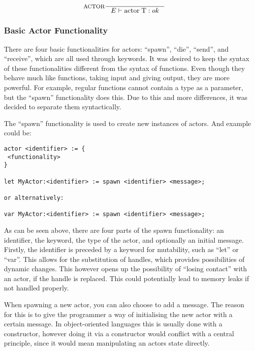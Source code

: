 \begin{align*}
&\inference[ACTOR]{}
                 {\Tenv \mathbin{\text{actor}} \; \Tt: ok}
\end{align*}

\subsubsection{Basic Actor Functionality}
\label{subsubsec:BasicActorFunctionality}
There are four basic functionalities for actors: \enquote{spawn}, \enquote{die}, \enquote{send}, and \enquote{receive}, which are all used through keywords. It was desired to keep the syntax of these functionalities different from the syntax of functions. Even though they behave much like functions, taking input and giving output, they are more powerful. For example, regular functions cannot contain a type as a parameter, but the \enquote{spawn} functionality does this. Due to this and more differences, it was decided to separate them syntactically.

The \enquote{spawn} functionality is used to create new instances of actors. And example could be:

\label{actorfuncSpawn}
\begin{lstlisting}
actor <identifier> := {
 <functionality>
}

let MyActor:<identifier> := spawn <identifier> <message>;

or alternatively:

var MyActor:<identifier> := spawn <identifier> <message>;
\end{lstlisting}

As can be seen above, there are four parts of the spawn functionality: an identifier, the keyword, the type of the actor, and optionally an initial message. Firstly, the identifier is preceded by a keyword for mutability, such as \enquote{let} or \enquote{var}. This allows for the substitution of handles, which provides possibilities of dynamic changes. This however opens up the possibility of \enquote{losing contact} with an actor, if the handle is replaced. This could potentially lead to memory leaks if not handled properly.

When spawning a new actor, you can also choose to add a message. The reason for this is to give the programmer a way of initialising the new actor with a certain message. In object-oriented languages this is usually done with a constructor, however doing it via a constructor would conflict with a central principle, since it would mean manipulating an actors state directly.

